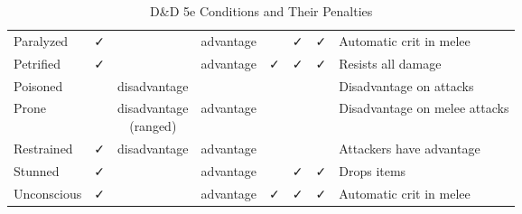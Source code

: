 \documentclass[12pt,letterpaper,landscape]{article}
\begin{document}
\begin{table}[h!]
\begin{tabular}{@{}l c c c c c c l@{}}
\rowcolor{beige}
Paralyzed          & ✓          &                & advantage    &            & ✓             & ✓             & Automatic crit in melee \\ 
Petrified          & ✓          &                & advantage    & ✓          & ✓             & ✓             & Resists all damage \\ 
\rowcolor{beige}
Poisoned           &            & disadvantage   &              &            &               &               & Disadvantage on attacks \\ 
Prone              &            & \parbox{2.5cm}{\centering disadvantage \\ (ranged)} 
                                   & advantage    &            &               &               & Disadvantage on melee attacks \\ 
Restrained         & ✓          & disadvantage   & advantage    &            &               &               & Attackers have advantage \\ 
Stunned            & ✓          &                & advantage    &            & ✓             & ✓             & Drops items \\ 
Unconscious        & ✓          &                & advantage    & ✓          & ✓             & ✓             & Automatic crit in melee \\ \bottomrule
\end{tabular}
\caption{D\&D 5e Conditions and Their Penalties}
\label{tab:conditions}
\end{table}
\end{document}
